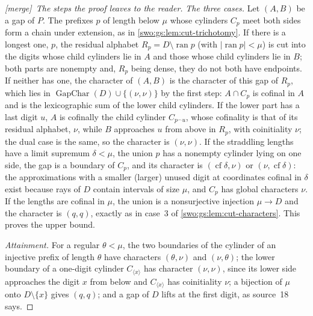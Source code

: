 \documentclass[11pt]{article}
\theoremstyle{definition}
\theoremstyle{remark}
\newcommand{\ran}{\operatorname{ran}}
\newcommand{\cf}{\operatorname{cf}}
\newcommand{\cat}{\mathbin{{}^\frown}}
\newcommand{\card}[1]{\lvert #1\rvert}
\newcommand{\merge}{\textsf{[merge]}}
\newcommand{\GapChar}{\operatorname{GapChar}}
\begin{document}
\begin{proof}[\merge\ The steps the proof leaves to the reader]
\emph{The three cases.} Let $(A,B)$ be a gap of $P$. The prefixes $p$ of
length below $\mu$ whose cylinders $C_p$ meet both sides form a chain under
extension, as in \cref{swo:gs:lem:cut-trichotomy}. If there is a longest one,
$p$, the residual alphabet $R_p=D\setminus\ran p$ (with $\card{\ran p}<\mu$) is
cut into the digits whose child cylinders lie in $A$ and those whose child
cylinders lie in $B$; both parts are nonempty and, $R_p$ being dense, they do
not both have endpoints. If neither has one, the character of $(A,B)$ is the
character of this gap of $R_p$, which lies in $\GapChar(D)\cup\{(\nu,\nu)\}$ by
the first step: $A\cap C_p$ is cofinal in $A$ and is the lexicographic sum of
the lower child cylinders. If the lower part has a last digit $u$, $A$ is
cofinally the child cylinder $C_{p\cat u}$, whose cofinality is that of its
residual alphabet, $\nu$, while $B$ approaches $u$ from above in $R_p$, with
coinitiality $\nu$; the dual case is the same, so the character is
$(\nu,\nu)$. If the straddling lengths have a limit supremum $\delta<\mu$, the
union $p$ has a nonempty cylinder lying on one side, the gap is a boundary of
$C_p$, and its character is $(\cf\delta,\nu)$ or $(\nu,\cf\delta)$: the
approximations with a smaller (larger) unused digit at coordinates cofinal in
$\delta$ exist because rays of $D$ contain intervals of size $\mu$, and $C_p$ has
global characters $\nu$. If the lengths are cofinal in $\mu$, the union is a
nonsurjective injection $\mu\to D$ and the character is $(q,q)$, exactly as in
case~3 of \cref{swo:gs:lem:cut-characters}. This proves the upper bound.

\emph{Attainment.} For a regular $\theta<\mu$, the two boundaries of the
cylinder of an injective prefix of length $\theta$ have characters $(\theta,\nu)$
and $(\nu,\theta)$; the lower boundary of a one-digit cylinder
$C_{\langle x\rangle}$ has character $(\nu,\nu)$, since its lower side
approaches the digit $x$ from below and $C_{\langle x\rangle}$ has coinitiality
$\nu$; a bijection of $\mu$ onto $D\setminus\{x\}$ gives $(q,q)$; and a gap of $D$
lifts at the first digit, as source~18 says.
\end{proof}
\end{document}
